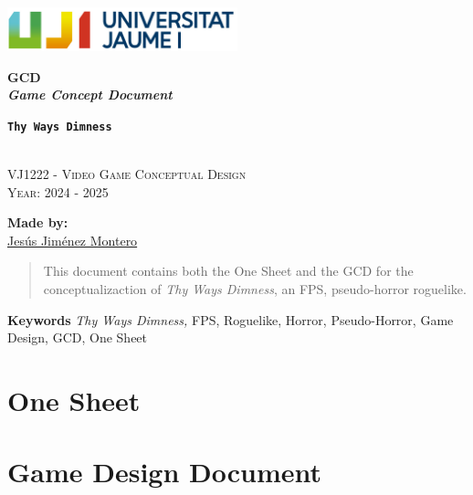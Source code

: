 \documentclass[12pt]{article}
\newcommand{\gameTitle}{\texttt{\textbf{Thy Ways Dimness}}}
\begin{document}
\begin{titlepage}
    \centering
    \vspace*{5cm}

    \includegraphics[width=0.5\textwidth]{Imagenes/marca-uji-color.jpg}\par\vspace{1cm}

    {\Huge \bfseries GCD \\ \textit{Game Concept Document} \par}
    {\large \bfseries \gameTitle \par}

    \textsc{\large }
    \vspace{0.5cm} \\
    \textsc{\Large VJ1222 - Video Game Conceptual Design}
    \vspace{0.5cm} \\
    \textsc{\large Year: 2024 - 2025}
    \vfill

    \textbf{Made by:}         \\
    \href{https://www.richardotomislav.com/}{Jesús Jiménez Montero }      \\

    \vspace{1cm}

    \vfill
\end{titlepage}

\begin{abstract}
    This document contains both the One Sheet and the GCD for the conceptualizaction of \textit{Thy Ways Dimness}, an FPS, pseudo-horror roguelike.
\end{abstract}
{\small \textbf{Keywords} \textit{Thy Ways Dimness,} FPS, Roguelike, Horror, Pseudo-Horror, Game Design, GCD, One Sheet}
\newpage

\renewcommand{\contentsname}{Table of Contents}
\tableofcontents
\newpage

\listoffigures
\newpage


\section*{\huge{One Sheet}}

\newpage
\section*{\huge{Game Design Document}}

\end{document}

